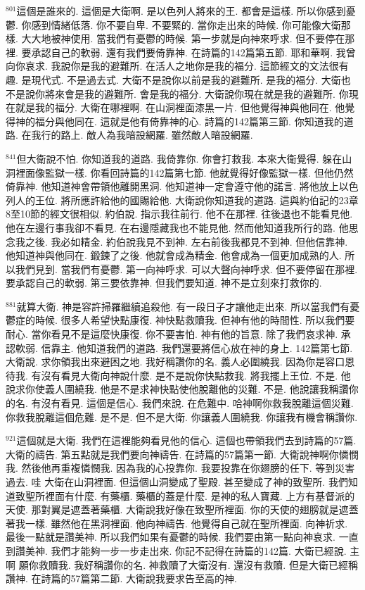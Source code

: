 \documentclass{book}
\begin{document}
$^{801}$這個是誰來的.
這個是大衛啊.
是以色列人將來的王.
都會是這樣.
所以你感到憂鬱.
你感到情緒低落.
你不要自卑.
不要緊的.
當你走出來的時候.
你可能像大衛那樣.
大大地被神使用.
當我們有憂鬱的時候.
第一步就是向神來呼求.
但不要停在那裡.
要承認自己的軟弱.
還有我們要倚靠神.
在詩篇的142篇第五節.
耶和華啊.
我曾向你哀求.
我說你是我的避難所.
在活人之地你是我的福分.
這節經文的文法很有趣.
是現代式.
不是過去式.
大衛不是說你以前是我的避難所.
是我的福分.
大衛也不是說你將來會是我的避難所.
會是我的福分.
大衛說你現在就是我的避難所.
你現在就是我的福分.
大衛在哪裡啊.
在山洞裡面漆黑一片.
但他覺得神與他同在.
他覺得神的福分與他同在.
這就是他有倚靠神的心.
詩篇的142篇第三節.
你知道我的道路.
在我行的路上.
敵人為我暗設網羅.
雖然敵人暗設網羅.

$^{841}$但大衛說不怕.
你知道我的道路.
我倚靠你.
你會打救我.
本來大衛覺得.
躲在山洞裡面像監獄一樣.
你看回詩篇的142篇第七節.
他就覺得好像監獄一樣.
但他仍然倚靠神.
他知道神會帶領他離開黑洞.
他知道神一定會遵守他的諾言.
將他放上以色列人的王位.
將所應許給他的國賜給他.
大衛說你知道我的道路.
這與約伯記的23章8至10節的經文很相似.
約伯說.
指示我往前行.
他不在那裡.
往後退也不能看見他.
他在左邊行事我卻不看見.
在右邊隱藏我也不能見他.
然而他知道我所行的路.
他思念我之後.
我必如精金.
約伯說我見不到神.
左右前後我都見不到神.
但他信靠神.
他知道神與他同在.
鍛鍊了之後.
他就會成為精金.
他會成為一個更加成熟的人.
所以我們見到.
當我們有憂鬱.
第一向神呼求.
可以大聲向神呼求.
但不要停留在那裡.
要承認自己的軟弱.
第三要依靠神.
但我們要知道.
神不是立刻來打救你的.

$^{881}$就算大衛.
神是容許掃羅繼續追殺他.
有一段日子才讓他走出來.
所以當我們有憂鬱症的時候.
很多人希望快點康復.
神快點救贖我.
但神有他的時間性.
所以我們要耐心.
當你看見不是這麼快康復.
你不要害怕.
神有他的旨意.
除了我們哀求神.
承認軟弱.
信靠主.
他知道我們的道路.
我們還要將信心放在神的身上.
142篇第七節.
大衛說.
求你領我出來避困之地.
我好稱讚你的名.
義人必圍繞我.
因為你是容口恩待我.
有沒有看見大衛向神說什麼.
是不是說你快點救我.
將我擺上王位.
不是.
他說求你使義人圍繞我.
他是不是求神快點使他脫離他的災難.
不是.
他說讓我稱讚你的名.
有沒有看見.
這個是信心.
我們來說.
在危難中.
哈神啊你救我脫離這個災難.
你救我脫離這個危難.
是不是.
但不是大衛.
你讓義人圍繞我.
你讓我有機會稱讚你.

$^{921}$這個就是大衛.
我們在這裡能夠看見他的信心.
這個也帶領我們去到詩篇的57篇.
大衛的禱告.
第五點就是我們要向神禱告.
在詩篇的57篇第一節.
大衛說神啊你憐憫我.
然後他再重複憐憫我.
因為我的心投靠你.
我要投靠在你翅膀的任下.
等到災害過去.
哇 大衛在山洞裡面.
但這個山洞變成了聖殿.
甚至變成了神的致聖所.
我們知道致聖所裡面有什麼.
有藥櫃.
藥櫃的蓋是什麼.
是神的私人寶藏.
上方有基督派的天使.
那對翼是遮蓋著藥櫃.
大衛說我好像在致聖所裡面.
你的天使的翅膀就是遮蓋著我一樣.
雖然他在黑洞裡面.
他向神禱告.
他覺得自己就在聖所裡面.
向神祈求.
最後一點就是讚美神.
所以我們如果有憂鬱的時候.
我們要由第一點向神哀求.
一直到讚美神.
我們才能夠一步一步走出來.
你記不記得在詩篇的142篇.
大衛已經說.
主啊 願你救贖我.
我好稱讚你的名.
神救贖了大衛沒有.
還沒有救贖.
但是大衛已經稱讚神.
在詩篇的57篇第二節.
大衛說我要求告至高的神.
\end{document}
